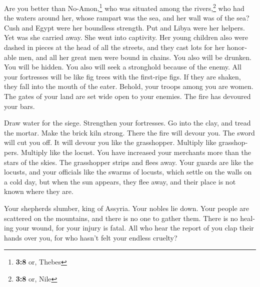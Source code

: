 \begin{paracol}{2}
\begin{otherlanguage}{english}
 Are you better than No-Amon,\footnote{\textbf{3:8} or,
  Thebes} who was situated among the rivers,\footnote{\textbf{3:8} or,
  Nile} who had the waters around her, whose rampart was the sea, and
her wall was of the sea?  Cush and Egypt were her
boundless strength. Put and Libya were her helpers.  Yet
was she carried away. She went into captivity. Her young children also
were dashed in pieces at the head of all the streets, and they cast lots
for her honorable men, and all her great men were bound in chains.
 You also will be drunken. You will be hidden. You also
will seek a stronghold because of the enemy.  All your
fortresses will be like fig trees with the first-ripe figs. If they are
shaken, they fall into the mouth of the eater.  Behold,
your troops among you are women. The gates of your land are set wide
open to your enemies. The fire has devoured your bars.

 Draw water for the siege. Strengthen your fortresses. Go
into the clay, and tread the mortar. Make the brick kiln strong.
 There the fire will devour you. The sword will cut you
off. It will devour you like the grasshopper. Multiply like
grasshoppers. Multiply like the locust.  You have
increased your merchants more than the stars of the skies. The
grasshopper strips and flees away.  Your guards are like
the locusts, and your officials like the swarms of locusts, which settle
on the walls on a cold day, but when the sun appears, they flee away,
and their place is not known where they are.

 Your shepherds slumber, king of Assyria. Your nobles lie
down. Your people are scattered on the mountains, and there is no one to
gather them.  There is no healing your wound, for your
injury is fatal. All who hear the report of you clap their hands over
you, for who hasn't felt your endless cruelty?
\end{otherlanguage} \end{paracol}
